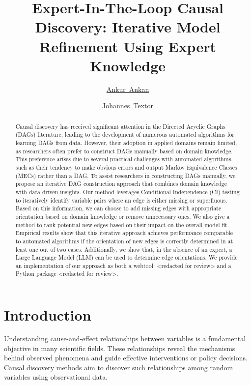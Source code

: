 \documentclass{uai2025} %
\title{Expert-In-The-Loop Causal Discovery: Iterative Model Refinement Using Expert Knowledge}
\author[1]{\href{mailto:<ankur.ankan@ru.nl>?Subject=Your UAI 2025 paper}{Ankur~Ankan}{}}
\author[1]{Johannes~Textor}
\affil[1]{%
    Institute for Computing and Information Sciences\\
    Radboud University\\
    Nijmegen, The Netherlands
}
\begin{document}
\maketitle

\begin{abstract}

	Causal discovery has received significant attention in the Directed
	Acyclic Graphs (DAGs) literature, leading to the development of
	numerous automated algorithms for learning DAGs from data. However,
	their adoption in applied domains remain limited, as researchers often
	prefer to construct DAGs manually based on domain knowledge. This
	preference arises due to several practical challenges with automated
	algorithms, such as their tendency to make obvious errors and output
	Markov Equivalence Classes (MECs) rather than a DAG. To assist
	researchers in constructing DAGs manually, we propose an iterative DAG
	construction approach that combines domain knowledge with data-driven
	insights. Our method leverages Conditional Independence (CI) testing to
	iteratively identify variable pairs where an edge is either missing or
	superfluous. Based on this information, we can choose to add missing
	edges with appropriate orientation based on domain knowledge or remove
	unnecessary ones. We also give a method to rank potential new edges
	based on their impact on the overall model fit. Empirical results show
	that this iterative approach achieves performance comparable to
	automated algorithms if the orientation of new edges is correctly
	determined in at least one out of two cases. Additionally, we show
	that, in the absence of an expert, a Large Language Model (LLM) can be
	used to determine edge orientations. We provide an implementation of
	our approach as both a webtool: <redacted for review> and a Python
	package <redacted for review>.

\end{abstract}

\section{Introduction}
Understanding cause-and-effect relationships between variables is a fundamental
objective in many scientific fields. These relationships reveal the mechanisms
behind observed phenomena and guide effective interventions or policy
decisions. Causal discovery methods aim to discover such relationships
among random variables using observational data. 

\end{document}

